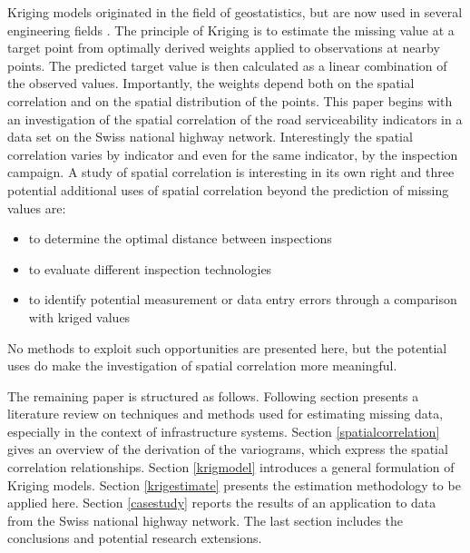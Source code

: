 \documentclass[Journal]{ascelike}
\begin{document}
Kriging models originated in the field of geostatistics, but are now used in several engineering fields 
\cite{Wackernagel1998}. The principle of Kriging is to estimate the missing value at a target point from optimally 
derived weights applied to observations at nearby points. The predicted target value is then calculated as a linear combination of the 
observed values. Importantly, the weights depend both on the spatial correlation and on the spatial distribution of the 
points. This paper begins with an investigation of the spatial correlation of the road serviceability indicators in a 
data set on the Swiss national highway network. Interestingly the spatial correlation varies by indicator and even for 
the same indicator, by the inspection campaign. A study of spatial correlation is interesting in its own right and 
three potential additional uses of spatial correlation beyond the prediction of missing values are:

\begin{itemize}
 \item to determine the optimal distance between inspections
 \item to evaluate different inspection technologies
 \item to identify potential measurement or data entry errors through a comparison with kriged values
\end{itemize}
%
No methods to exploit such opportunities are presented here, but the potential uses do make the investigation of spatial 
correlation more meaningful.

The remaining paper is structured as follows. Following section presents a literature review on techniques and methods used for estimating missing data, especially in the context of infrastructure systems. Section \ref{spatialcorrelation} gives an overview of the derivation of the variograms, which express the spatial correlation relationships. Section \ref{krigmodel} introduces a general formulation of Kriging models. Section \ref{krigestimate} presents the estimation methodology to be applied here. Section \ref{casestudy} reports the results of an application to data from the Swiss national highway network. The last section includes the conclusions and potential research extensions.
\end{document}
